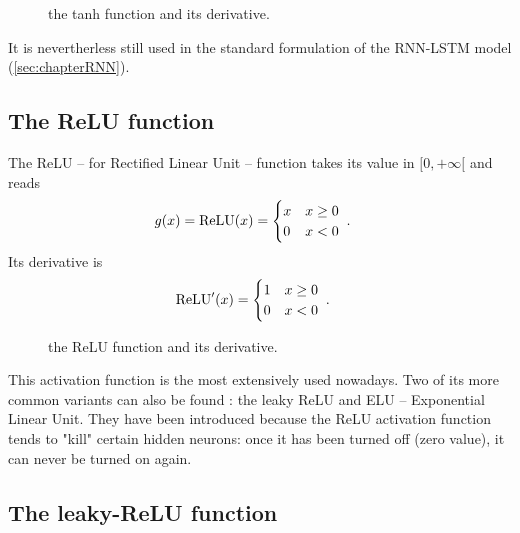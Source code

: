 \begin{figure}[H]
\begin{center}
\end{center}
\caption{\label{fig:tanh} the tanh function and its derivative.}
\end{figure}

It is nevertherless still used in the standard formulation of the RNN-LSTM model (\ref{sec:chapterRNN}).

\subsection{The ReLU function}


The ReLU -- for Rectified Linear Unit -- function takes its value in $[0,+\infty[$ and reads
\begin{align}
g(x)&={\rm ReLU}(x)=\begin{cases}
      x & x\geq 0 \\
      0& x<0
   \end{cases}\;.
\end{align}
Its derivative is
\begin{align}
{\rm ReLU}'(x)&=\begin{cases}
      1 & x\geq 0 \\
      0 & x<0
   \end{cases}\;.
\end{align}

\begin{figure}[H]
\begin{center}
\end{center}
\caption{\label{fig:relu} the ReLU function and its derivative.}
\end{figure}


This activation function is the most extensively used nowadays. Two of its more common variants can also be found : the leaky ReLU and ELU -- Exponential Linear Unit. They have been introduced because the ReLU activation function tends to "kill" certain hidden neurons: once it has been turned off (zero value), it can never be turned on again.



\subsection{The leaky-ReLU function}


